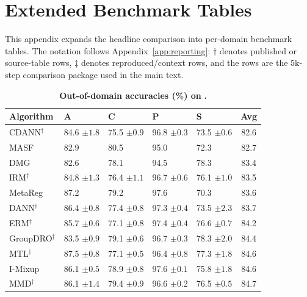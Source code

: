 \section{Extended Benchmark Tables}
\label{app:extended_tables}

This appendix expands the headline comparison into per-domain benchmark tables. The notation follows Appendix~\ref{app:reporting}: \(\dagger\) denotes published or source-table rows, \(\ddagger\) denotes reproduced/context rows, and the \cda{} rows are the \(5\mathrm{k}\)-step comparison package used in the main text.

\begin{table}[htbp]
\centering
\small
\renewcommand{\arraystretch}{1.1}
\caption{\textbf{Out-of-domain accuracies (\%) on} \textbf{.}}
\begin{tabular}{lllll|c}
\toprule
\textbf{Algorithm} & \textbf{A} & \textbf{C} & \textbf{P} & \textbf{S} & \textbf{Avg} \\
\midrule
CDANN$^\dagger$ & 84.6 \scriptsize$\pm1.8$ & 75.5 \scriptsize$\pm0.9$ & 96.8 \scriptsize$\pm0.3$ & 73.5 \scriptsize$\pm0.6$ & 82.6 \\
MASF & 82.9 & 80.5 & 95.0 & 72.3 & 82.7 \\
DMG & 82.6 & 78.1 & 94.5 & 78.3 & 83.4 \\
IRM$^\dagger$ & 84.8 \scriptsize$\pm1.3$ & 76.4 \scriptsize$\pm1.1$ & 96.7 \scriptsize$\pm0.6$ & 76.1 \scriptsize$\pm1.0$ & 83.5 \\
MetaReg & 87.2 & 79.2 & 97.6 & 70.3 & 83.6 \\
DANN$^\dagger$ & 86.4 \scriptsize$\pm0.8$ & 77.4 \scriptsize$\pm0.8$ & 97.3 \scriptsize$\pm0.4$ & 73.5 \scriptsize$\pm2.3$ & 83.7 \\
ERM$^\ddagger$ & 85.7 \scriptsize$\pm0.6$ & 77.1 \scriptsize$\pm0.8$ & 97.4 \scriptsize$\pm0.4$ & 76.6 \scriptsize$\pm0.7$ & 84.2 \\
GroupDRO$^\dagger$ & 83.5 \scriptsize$\pm0.9$ & 79.1 \scriptsize$\pm0.6$ & 96.7 \scriptsize$\pm0.3$ & 78.3 \scriptsize$\pm2.0$ & 84.4 \\
MTL$^\dagger$ & 87.5 \scriptsize$\pm0.8$ & 77.1 \scriptsize$\pm0.5$ & 96.4 \scriptsize$\pm0.8$ & 77.3 \scriptsize$\pm1.8$ & 84.6 \\
I-Mixup & 86.1 \scriptsize$\pm0.5$ & 78.9 \scriptsize$\pm0.8$ & 97.6 \scriptsize$\pm0.1$ & 75.8 \scriptsize$\pm1.8$ & 84.6 \\
MMD$^\dagger$ & 86.1 \scriptsize$\pm1.4$ & 79.4 \scriptsize$\pm0.9$ & 96.6 \scriptsize$\pm0.2$ & 76.5 \scriptsize$\pm0.5$ & 84.7 \\

\end{tabular}
\end{table}
